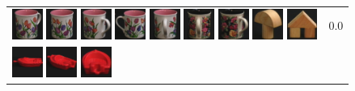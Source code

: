 {\begin{figure}[p]
\begin{tabular}{m{11cm} | m{3cm} |}
\includegraphics[width=1cm]{coil/beeld-9.eps}
\includegraphics[width=1cm]{coil/beeld-8.eps}
\includegraphics[width=1cm]{coil/beeld-10.eps}
\includegraphics[width=1cm]{coil/beeld-7.eps}
\includegraphics[width=1cm]{coil/beeld-11.eps}
\includegraphics[width=1cm]{coil/beeld-65.eps}
\includegraphics[width=1cm]{coil/beeld-64.eps}
\includegraphics[width=1cm]{coil/beeld-4.eps}
\includegraphics[width=1cm]{coil/beeld-43.eps}
& {\scriptsize 0.0}
\\
\includegraphics[width=1cm]{coil/beeld-18.eps}
\includegraphics[width=1cm]{coil/beeld-22.eps}
\includegraphics[width=1cm]{coil/beeld-23.eps}

\end{tabular}
\end{figure}}
